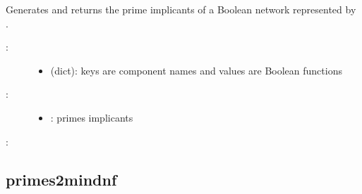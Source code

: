 \documentclass[letterpaper,10pt,english]{sphinxmanual}
\begin{document}
\begin{fulllineitems}
\label{\detokenize{QuineMcCluskey:PyBoolNet.QuineMcCluskey.functions2primes}}
Generates and returns the prime implicants of a Boolean network represented by .
\begin{description}
\item[{:}] \leavevmode\begin{itemize}
\item {} 
 (dict): keys are component names and values are Boolean functions

\end{itemize}

\item[{:}] \leavevmode\begin{itemize}
\item {} 
: primes implicants

\end{itemize}

\end{description}

:

\begin{sphinxVerbatim}[commandchars=\\\{\}]
        
            
  
\end{sphinxVerbatim}

\end{fulllineitems}



\subsection{primes2mindnf}
\label{\detokenize{QuineMcCluskey:id4}}\label{\detokenize{QuineMcCluskey:primes2mindnf}}
\end{document}
